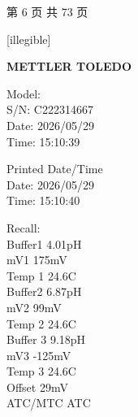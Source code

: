 \documentclass[UTF8,10pt,a4paper,fontset=fandol]{ctexart}
\newcommand{\fieldvalue}[1]{#1}
\newcommand{\handwritten}[1]{#1}
\begin{document}
\begin{center}
第 6 页 共 73 页
\end{center}

\newpage

\noindent
\begin{minipage}[t]{0.47\linewidth}
\handwritten{[illegible]}

\textbf{METTLER TOLEDO}

\noindent
Model: \\
S/N: \fieldvalue{C222314667}\\
Date: \fieldvalue{2026/05/29}\\
Time: \fieldvalue{15:10:39}

\medskip
\noindent
Printed Date/Time\\
Date: \fieldvalue{2026/05/29}\\
Time: \fieldvalue{15:10:40}

\noindent
Recall:\\
Buffer1 \fieldvalue{4.01pH}\\
mV1 \fieldvalue{175mV}\\
Temp 1 \fieldvalue{24.6\textdegree C}\\
Buffer2 \fieldvalue{6.87pH}\\
mV2 \fieldvalue{99mV}\\
Temp 2 \fieldvalue{24.6\textdegree C}\\
Buffer 3 \fieldvalue{9.18pH}\\
mV3 \fieldvalue{-125mV}\\
Temp 3 \fieldvalue{24.6\textdegree C}\\
Offset \fieldvalue{29mV}\\
ATC/MTC \fieldvalue{ATC}


\end{minipage}
\end{document}
